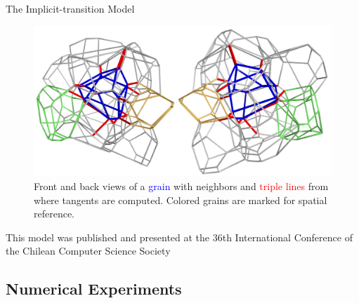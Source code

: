 \documentclass[usenames,dvipsnames]{beamer}
\begin{document}
\begin{frame}{The Implicit-transition Model}
\begin{figure}
    \centering
    \includegraphics[scale=0.25]{figures/extras/views.png}
    \caption{Front and back views of a \textcolor{blue}{grain} with neighbors and \textcolor{red}{triple lines} from where tangents are computed. Colored grains are marked for spatial reference.}
\end{figure}
This model was published and presented at the 36th International Conference of the Chilean Computer Science Society~\cite{sazo2017implicit}
\end{frame}

\subsection{Numerical Experiments}

\begin{frame}
   \centering
\end{frame}

\begin{frame}
   \centering
\end{frame}
\end{document}
